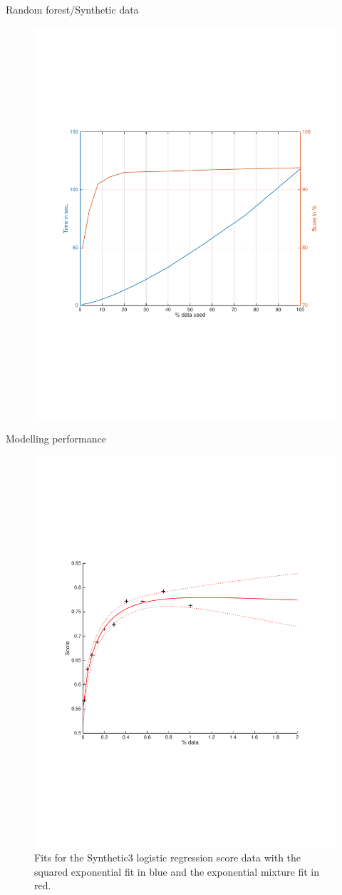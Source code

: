 \documentclass[handout]{beamer}
\begin{document}
\begin{frame}{Random forest/Synthetic data}
\begin{figure}
  \centering
  \includegraphics[trim=50 200 35 205,clip,width=.75\linewidth]{rf_synth.pdf}
  \label{sampledata1}	
\end{figure}
\end{frame}

\begin{frame}{Modelling performance}
\begin{figure}
  \includegraphics[trim=50 190 50 200,clip,width=.7\textwidth]{synth3_rndforest_fit.pdf}
  \caption{Fits for the Synthetic3 logistic regression score data with the squared exponential fit in blue and the exponential mixture fit in red.}
  \label{synth3_rndforest_fit}
\end{figure}
\end{frame}
\end{document}
